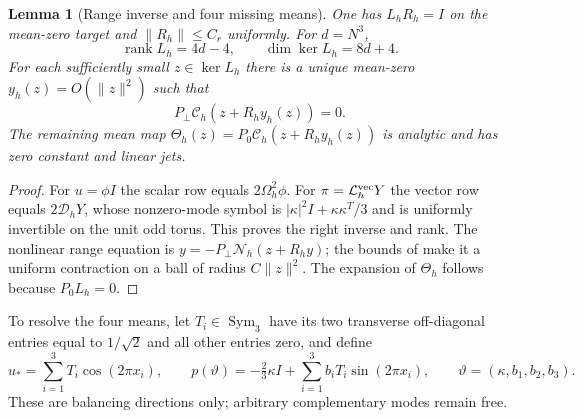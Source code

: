 \documentclass[11pt]{article}
\numberwithin{equation}{section}
\newtheorem{lemma}[lemma]{Lemma}
\theoremstyle{definition}
\theoremstyle{remark}
\begin{document}
\begin{lemma}[Range inverse and four missing means]
\label{lem:supp-initial-range}
One has $L_hR_h=I$ on the mean-zero target and
$\|R_h\|\le C_r$ uniformly.  For $d=N^3$,
\begin{equation}
 \operatorname{rank}L_h=4d-4,
 \qquad\dim\ker L_h=8d+4.
 \label{eq:supp-initial-rank}
\end{equation}
For each sufficiently small $z\in\ker L_h$ there is a unique mean-zero
$y_h(z)=O(\|z\|^2)$ such that
\begin{equation}
 P_\perp\mathscr C_h(z+R_hy_h(z))=0.
 \label{eq:supp-initial-range-zero}
\end{equation}
The remaining mean map
$\Theta_h(z)=P_0\mathscr C_h(z+R_hy_h(z))$ is analytic and has zero constant
and linear jets.
\end{lemma}
\begin{proof}
For $u=\phi I$ the scalar row equals $2\Omega_h^2\phi$.  For
$\pi=\mathcal L_h^{\rm vec}Y$ the vector row equals $2\mathcal D_hY$, whose
nonzero-mode symbol is $|\kappa|^2I+\kappa\kappa^T/3$ and is uniformly
invertible on the unit odd torus.  This proves the right inverse and rank.
The nonlinear range equation is
$y=-P_\perp\mathscr N_h(z+R_hy)$; the bounds of
 make it a uniform contraction on a ball of
radius $C\|z\|^2$.  The expansion of $\Theta_h$ follows because
$P_0L_h=0$.
\end{proof}

To resolve the four means, let $T_i\in\operatorname{Sym}_3$ have its two
transverse off-diagonal entries equal to $1/\sqrt2$ and all other entries
zero, and define
\begin{equation}
 u_*=\sum_{i=1}^3T_i\cos(2\pi x_i),\qquad
 p(\vartheta)=-\tfrac23\kappa I
       +\sum_{i=1}^3b_iT_i\sin(2\pi x_i),
 \qquad \vartheta=(\kappa,b_1,b_2,b_3).
 \label{eq:supp-initial-seed}
\end{equation}
These are balancing directions only; arbitrary complementary modes remain
free.
\end{document}

